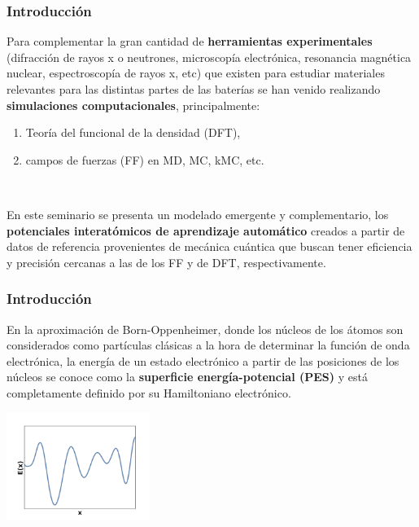 \documentclass[aspectratio=169]{beamer}
\let\oldtextbf\textbf
\renewcommand{\textbf}[1]{\textcolor{nordblue}{\oldtextbf{#1}}}
\begin{document}
    \begin{frame}
        \frametitle{Introducción}
        
        Para complementar la gran cantidad de \textbf{herramientas experimentales}
        (difracción de rayos x o neutrones, microscopía electrónica, resonancia
        magnética nuclear, espectroscopía de rayos x, etc) que existen para 
        estudiar materiales relevantes para las distintas partes de las baterías 
        se han venido realizando \textbf{simulaciones computacionales}, 
        principalmente:
        \begin{enumerate}
            \item Teoría del funcional de la densidad (DFT),
            \item campos de fuerzas (FF) en MD, MC, kMC, etc.
        \end{enumerate}

        \ \pause

        En este seminario se presenta un modelado emergente y complementario, los
        \textbf{potenciales interatómicos de aprendizaje automático} creados a 
        partir de datos de referencia provenientes de mecánica cuántica que buscan
        tener eficiencia y precisión cercanas a las de los FF y de DFT, 
        respectivamente.

	\end{frame}

    \begin{frame}
        \frametitle{Introducción}

        En la aproximación de Born-Oppenheimer, donde los núcleos de los átomos
        son considerados como partículas clásicas a la hora de determinar la 
        función de onda electrónica, la energía de un estado electrónico a partir 
        de las posiciones de los núcleos se conoce como la \textbf{superficie 
        energía-potencial (PES)} y está completamente definido por su Hamiltoniano
        electrónico.

        \pause

        \begin{center}
            \includegraphics[width=0.35\textwidth]{intro-pes.png}
        \end{center}

	\end{frame}
\end{document}
